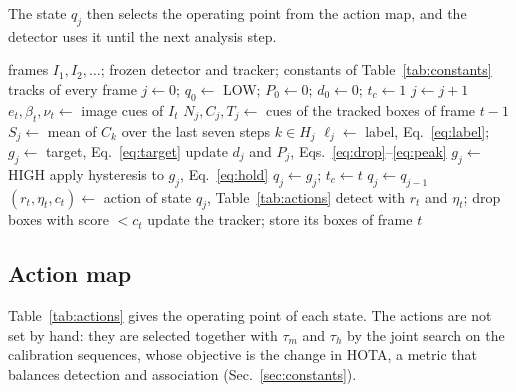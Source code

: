 \documentclass[journal]{new-aiaa}
\begin{document}
The state $q_j$ then selects the operating point from the action map, and the
detector uses it until the next analysis step.

\begin{algorithm}[htbp]
\caption{AC-MOT controller for one video}\label{alg:controller}
\begin{algorithmic}[1]
\Require frames $I_1, I_2, \dots$; frozen detector and tracker; constants of Table~\ref{tab:constants}
\Ensure tracks of every frame
\State $j\gets0$; $q_0\gets$ LOW; $P_0\gets0$; $d_0\gets0$; $t_c\gets1$
   
    \State $j\gets j+1$
    \State $e_t,\beta_t,\nu_t\gets$ image cues of $I_t$ 
    \State $N_j,C_j,T_j\gets$ cues of the tracked boxes of frame $t-1$ 
    \State $S_j\gets$ mean of $C_k$ over the last seven steps $k\in H_j$ 
    \State $\ell_j\gets$ label, Eq.~\eqref{eq:label}; $g_j\gets$ target, Eq.~\eqref{eq:target} 
    \State update $d_j$ and $P_j$, Eqs.~\eqref{eq:drop}--\eqref{eq:peak}
     $g_j\gets$ HIGH 
    \EndIf
    \State apply hysteresis to $g_j$, Eq.~\eqref{eq:hold} 
     
      \State $q_j\gets g_j$; $t_c\gets t$
    \Else
      \State $q_j\gets q_{j-1}$
    \EndIf
  \EndIf
  \State $(r_t,\eta_t,c_t)\gets$ action of state $q_j$, Table~\ref{tab:actions} 
  \State detect with $r_t$ and $\eta_t$; drop boxes with score $<c_t$
  \State update the tracker; store its boxes of frame $t$ 
\EndFor
\end{algorithmic}
\end{algorithm}

\subsection{Action map}\label{sec:actions}
Table~\ref{tab:actions} gives the operating point of each state. The actions
are not set by hand: they are selected together with $\tau_m$ and $\tau_h$
by the joint search on the calibration sequences, whose objective is the
change in HOTA, a metric that balances detection and association
(Sec.~\ref{sec:constants}).
\end{document}
